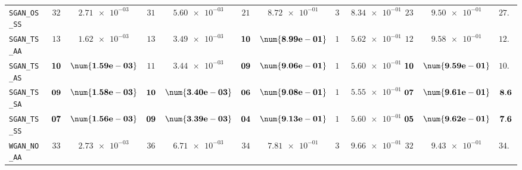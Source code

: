 \begin{xltabular}{\textwidth}{l||cC|cC|cC|cC|cC||c}
	\texttt{SGAN\_OS\_SS} & $ 32$ & $ \num{2.71e-03}$ & $ 31$ & $ \num{5.60e-03}$ & $ 21$ & $ \num{8.72e-01}$ & $ 31$ & $ \num{8.34e-01}$ & $ 23$ & $ \num{9.50e-01}$ & $ 27.6$  \\
	\texttt{SGAN\_TS\_AA} & $ 13$ & $ \num{1.62e-03}$ & $ 13$ & $ \num{3.49e-03}$ & $\bf 10$ & $\bf \num{8.99e-01}$ & $ 14$ & $ \num{5.62e-01}$ & $ 12$ & $ \num{9.58e-01}$ & $ 12.4$  \\
	\texttt{SGAN\_TS\_AS} & $\bf 10$ & $\bf \num{1.59e-03}$ & $ 11$ & $ \num{3.44e-03}$ & $\bf 09$ & $\bf \num{9.06e-01}$ & $ 12$ & $ \num{5.60e-01}$ & $\bf 10$ & $\bf \num{9.59e-01}$ & $ 10.4$  \\
	\texttt{SGAN\_TS\_SA} & $\bf 09$ & $\bf \num{1.58e-03}$ & $\bf 10$ & $\bf \num{3.40e-03}$ & $\bf 06$ & $\bf \num{9.08e-01}$ & $ 11$ & $ \num{5.55e-01}$ & $\bf 07$ & $\bf \num{9.61e-01}$ & $\bf 8.6$  \\
	\texttt{SGAN\_TS\_SS} & $\bf 07$ & $\bf \num{1.56e-03}$ & $\bf 09$ & $\bf \num{3.39e-03}$ & $\bf 04$ & $\bf \num{9.13e-01}$ & $ 13$ & $ \num{5.60e-01}$ & $\bf 05$ & $\bf \num{9.62e-01}$ & $\bf 7.6$  \\ \hline
	\texttt{WGAN\_NO\_AA} & $ 33$ & $ \num{2.73e-03}$ & $ 36$ & $ \num{6.71e-03}$ & $ 34$ & $ \num{7.81e-01}$ & $ 36$ & $ \num{9.66e-01}$ & $ 32$ & $ \num{9.43e-01}$ & $ 34.2$  \\

\end{xltabular}
